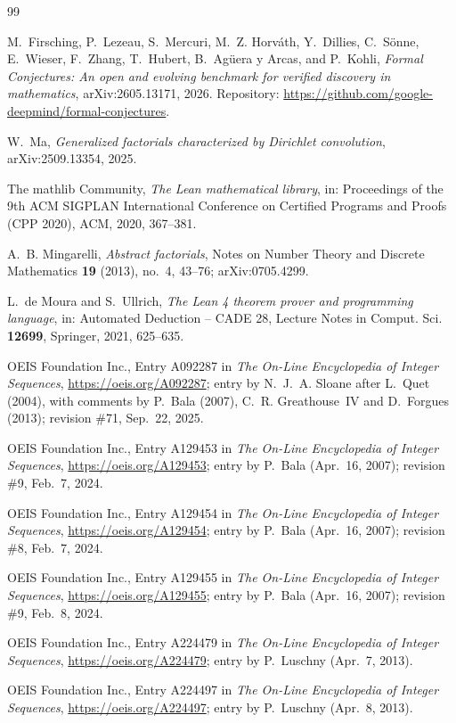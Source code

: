 \documentclass[11pt]{amsart}
\theoremstyle{plain}
\theoremstyle{definition}
\begin{document}
{\small
\begin{thebibliography}{99}

M.~Firsching, P.~Lezeau, S.~Mercuri, M.~Z. Horv\'ath, Y.~Dillies, C.~S\"onne, E.~Wieser, F.~Zhang, T.~Hubert, B.~Ag\"uera y Arcas, and P.~Kohli, \emph{Formal Conjectures: An open and evolving benchmark for verified discovery in mathematics}, arXiv:2605.13171, 2026. Repository: \url{https://github.com/google-deepmind/formal-conjectures}.

W.~Ma, \emph{Generalized factorials characterized by Dirichlet convolution}, arXiv:2509.13354, 2025.

The mathlib Community, \emph{The Lean mathematical library}, in: Proceedings of the 9th ACM SIGPLAN International Conference on Certified Programs and Proofs (CPP 2020), ACM, 2020, 367--381.

A.~B. Mingarelli, \emph{Abstract factorials}, Notes on Number Theory and Discrete Mathematics \textbf{19} (2013), no.~4, 43--76; arXiv:0705.4299.

L.~de Moura and S.~Ullrich, \emph{The Lean 4 theorem prover and programming language}, in: Automated Deduction -- CADE 28, Lecture Notes in Comput. Sci. \textbf{12699}, Springer, 2021, 625--635.

OEIS Foundation Inc., Entry A092287 in \emph{The On-Line Encyclopedia of Integer Sequences}, \url{https://oeis.org/A092287}; entry by N.~J.~A. Sloane after L.~Quet (2004), with comments by P.~Bala (2007), C.~R. Greathouse~IV and D.~Forgues (2013); revision \#71, Sep.~22, 2025.

OEIS Foundation Inc., Entry A129453 in \emph{The On-Line Encyclopedia of Integer Sequences}, \url{https://oeis.org/A129453}; entry by P.~Bala (Apr.~16, 2007); revision \#9, Feb.~7, 2024.

OEIS Foundation Inc., Entry A129454 in \emph{The On-Line Encyclopedia of Integer Sequences}, \url{https://oeis.org/A129454}; entry by P.~Bala (Apr.~16, 2007); revision \#8, Feb.~7, 2024.

OEIS Foundation Inc., Entry A129455 in \emph{The On-Line Encyclopedia of Integer Sequences}, \url{https://oeis.org/A129455}; entry by P.~Bala (Apr.~16, 2007); revision \#9, Feb.~8, 2024.

OEIS Foundation Inc., Entry A224479 in \emph{The On-Line Encyclopedia of Integer Sequences}, \url{https://oeis.org/A224479}; entry by P.~Luschny (Apr.~7, 2013).

OEIS Foundation Inc., Entry A224497 in \emph{The On-Line Encyclopedia of Integer Sequences}, \url{https://oeis.org/A224497}; entry by P.~Luschny (Apr.~8, 2013).

\end{thebibliography}
}
\end{document}
